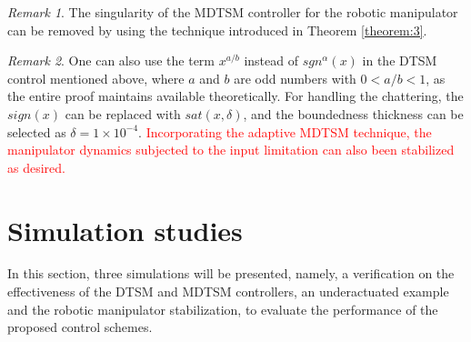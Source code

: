 \documentclass[3p]{elsarticle}
\theoremstyle{plain}
\theoremstyle{remark}
\newtheorem{myrem}{Remark}
\begin{document}
\begin{myrem}
The singularity of the MDTSM controller for the robotic manipulator can be removed by using the technique introduced in Theorem \ref{theorem:3}.
\end{myrem}
\begin{myrem}
One can also use the term $x^{a/b}$ instead of $sgn^\alpha(x)$ in the DTSM control mentioned above, where $a$ and $b$ are odd numbers with $0<a/b<1$, as the entire proof maintains available theoretically. For handling the chattering, the $sign(x)$ can be replaced with $sat(x,\delta)$, and the boundedness thickness can be selected as $\delta=1\times 10^{-4}$. \textcolor{red}{Incorporating the adaptive MDTSM technique, the manipulator dynamics subjected to the input limitation can also been stabilized as desired.}
\end{myrem}
\section{Simulation studies}\label{sec:4}
In this section, three simulations will be presented, namely, a verification on the effectiveness of the DTSM and MDTSM controllers, an underactuated example and the robotic manipulator stabilization, to evaluate the performance of the proposed control schemes.
\end{document}
